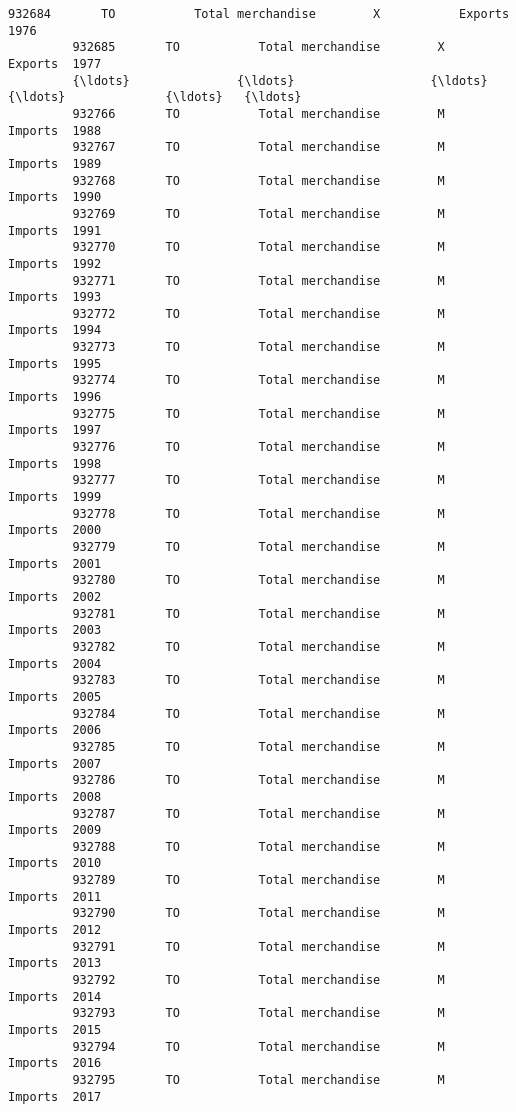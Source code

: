 \documentclass[11pt]{article}
\begin{document}
\begin{Verbatim}[commandchars=\\\{\}]
         932684       TO           Total merchandise        X           Exports  1976   
         932685       TO           Total merchandise        X           Exports  1977   
         {\ldots}               {\ldots}                   {\ldots}       {\ldots}              {\ldots}   {\ldots}   
         932766       TO           Total merchandise        M           Imports  1988   
         932767       TO           Total merchandise        M           Imports  1989   
         932768       TO           Total merchandise        M           Imports  1990   
         932769       TO           Total merchandise        M           Imports  1991   
         932770       TO           Total merchandise        M           Imports  1992   
         932771       TO           Total merchandise        M           Imports  1993   
         932772       TO           Total merchandise        M           Imports  1994   
         932773       TO           Total merchandise        M           Imports  1995   
         932774       TO           Total merchandise        M           Imports  1996   
         932775       TO           Total merchandise        M           Imports  1997   
         932776       TO           Total merchandise        M           Imports  1998   
         932777       TO           Total merchandise        M           Imports  1999   
         932778       TO           Total merchandise        M           Imports  2000   
         932779       TO           Total merchandise        M           Imports  2001   
         932780       TO           Total merchandise        M           Imports  2002   
         932781       TO           Total merchandise        M           Imports  2003   
         932782       TO           Total merchandise        M           Imports  2004   
         932783       TO           Total merchandise        M           Imports  2005   
         932784       TO           Total merchandise        M           Imports  2006   
         932785       TO           Total merchandise        M           Imports  2007   
         932786       TO           Total merchandise        M           Imports  2008   
         932787       TO           Total merchandise        M           Imports  2009   
         932788       TO           Total merchandise        M           Imports  2010   
         932789       TO           Total merchandise        M           Imports  2011   
         932790       TO           Total merchandise        M           Imports  2012   
         932791       TO           Total merchandise        M           Imports  2013   
         932792       TO           Total merchandise        M           Imports  2014   
         932793       TO           Total merchandise        M           Imports  2015   
         932794       TO           Total merchandise        M           Imports  2016   
         932795       TO           Total merchandise        M           Imports  2017   
         

\end{Verbatim}
\end{document}

